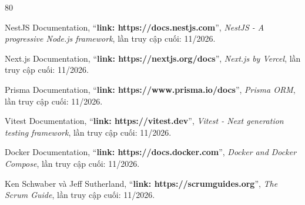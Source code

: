 \documentclass[a4paper]{article}
\begin{document}
\clearpage
\appendix

\clearpage
\begin{thebibliography}{80}

NestJS Documentation,
``\textbf{link: https://docs.nestjs.com}'',
\textit{NestJS - A progressive Node.js framework}, lần truy cập cuối: 11/2026.

Next.js Documentation,
``\textbf{link: https://nextjs.org/docs}'',
\textit{Next.js by Vercel}, lần truy cập cuối: 11/2026.

Prisma Documentation,
``\textbf{link: https://www.prisma.io/docs}'',
\textit{Prisma ORM}, lần truy cập cuối: 11/2026.

Vitest Documentation,
``\textbf{link: https://vitest.dev}'',
\textit{Vitest - Next generation testing framework}, lần truy cập cuối: 11/2026.

Docker Documentation,
``\textbf{link: https://docs.docker.com}'',
\textit{Docker and Docker Compose}, lần truy cập cuối: 11/2026.

Ken Schwaber và Jeff Sutherland,
``\textbf{link: https://scrumguides.org}'',
\textit{The Scrum Guide}, lần truy cập cuối: 11/2026.

\end{thebibliography}
\end{document}
